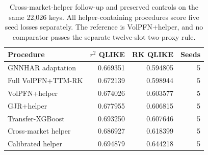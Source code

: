 \begin{table}[H]\centering
\begingroup\small\setlength{\tabcolsep}{4pt}
\caption[Complete cross-market-helper scores]{Cross-market-helper follow-up and preserved controls on the same 22,026 keys. All helper-containing procedures score five seed losses separately. The reference is VolPFN+helper, and no comparator passes the separate twelve-slot two-proxy rule.}\label{tab:new-helper-all}
\begin{tabular}{@{}>{\raggedright\arraybackslash}p{6.5cm}rrr@{}}
\toprule
Procedure & $r^2$ QLIKE & RK QLIKE & Seeds \\
\midrule
GNNHAR adaptation & 0.669351 & 0.594805 & 5 \\
Full VolPFN+TTM-RK & 0.672139 & 0.598944 & 5 \\
VolPFN+helper & 0.674026 & 0.603577 & 5 \\
GJR+helper & 0.677955 & 0.606815 & 5 \\
Transfer-XGBoost & 0.693250 & 0.607646 & 5 \\
Cross-market helper & 0.686927 & 0.618399 & 5 \\
Calibrated helper & 0.694879 & 0.644218 & 5 \\
\bottomrule
\end{tabular}\endgroup\end{table}
